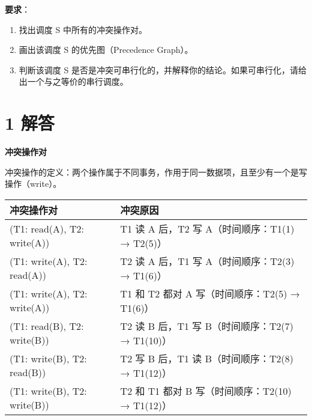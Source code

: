 \documentclass{article}
\begin{document}
	\textbf{要求}：
	
	\begin{enumerate}[noitemsep, label={{\arabic*})}]
		\item 找出调度 S 中所有的冲突操作对。
		
		\item 画出该调度 S 的优先图（Precedence Graph）。
		
		\item 判断该调度 S 是否是冲突可串行化的，并解释你的结论。如果可串行化，请给出一个与之等价的串行调度。
	\end{enumerate}\textbf{}
	
	\section*{1 解答}
	
	\textbf{冲突操作对}
	
	冲突操作的定义：两个操作属于不同事务，作用于同一数据项，且至少有一个是写操作（write）。
	
	\begin{table}[!ht]
		\centering
		\begin{tabular}{|l|l|}
			\hline
			冲突操作对 & 冲突原因  \\ \hline
			(T1: read(A), T2: write(A)) & T1 读 A 后，T2 写 A（时间顺序：T1(1) → T2(5)）  \\ \hline
			(T1: write(A), T2: read(A)) & T2 读 A 后，T1 写 A（时间顺序：T2(3) → T1(6)）  \\ \hline
			(T1: write(A), T2: write(A)) & T1 和 T2 都对 A 写（时间顺序：T2(5) → T1(6)）  \\ \hline
			(T1: read(B), T2: write(B)) & T2 读 B 后，T1 写 B（时间顺序：T2(7) → T1(10)）  \\ \hline
			(T1: write(B), T2: read(B)) & T2 写 B 后，T1 读 B（时间顺序：T2(8) → T1(12)）  \\ \hline
			(T1: write(B), T2: write(B)) & T2 和 T1 都对 B 写（时间顺序：T2(10) → T1(12)）  \\ \hline
		\end{tabular}
	\end{table}
	
	
\end{document}
